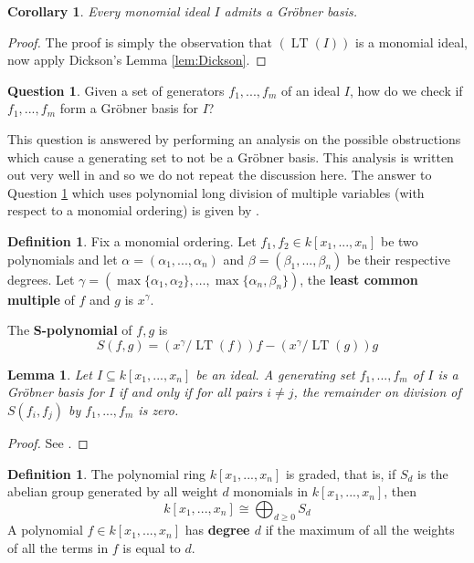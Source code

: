 \documentclass[12pt]{article}
\theoremstyle{plain}
\newtheorem{lemma}[thm]{Lemma}
\newtheorem{cor}[thm]{Corollary}
\theoremstyle{definition}
\newtheorem{defn}[thm]{Definition} %
\newtheorem{question}[thm]{Question}
\begin{document}
\begin{cor}\label{cor:grobner_basis_existence}
Every monomial ideal $I$ admits a Gr\"{o}bner basis.
\end{cor}
\begin{proof}
The proof is simply the observation that $(\operatorname{LT}(I))$ is a monomial ideal, now apply Dickson's Lemma \ref{lem:Dickson}.
\end{proof}
\begin{question}\label{question:Grobner_check}
Given a set of generators $f_1,...,f_m$ of an ideal $I$, how do we check if $f_1,...,f_m$ form a Gr\"{o}bner basis for $I$?
\end{question}
This question is answered by performing an analysis on the possible obstructions which cause a generating set to not be a Gr\"{o}bner basis. This analysis is written out very well in \cite[\S 2]{grobner} and so we do not repeat the discussion here. The answer to Question \ref{question:Grobner_check} which uses polynomial long division of multiple variables (with respect to a monomial ordering) is given by \cite[\S 2.3]{grobner}.
\begin{defn}
Fix a monomial ordering. Let $f_1,f_2 \in k[x_1,...,x_n]$ be two polynomials and let $\alpha = (\alpha_1,...,\alpha_n)$ and $\beta = (\beta_1,...,\beta_n)$ be their respective degrees. Let $\gamma = (\operatorname{max}\lbrace \alpha_1,\alpha_2\rbrace,\hdots,\operatorname{max}\lbrace \alpha_n,\beta_n\rbrace)$, the \textbf{least common multiple} of $f$ and $g$ is $x^\gamma$.

The \textbf{S-polynomial} of $f,g$ is
\begin{equation}
    S(f,g) = (x^\gamma/\operatorname{LT}(f))f - (x^\gamma/\operatorname{LT}(g))g
\end{equation}
\end{defn}
\begin{lemma}\label{lem:suffices_S_poly}
Let $I \subseteq k[x_1,...,x_n]$ be an ideal. A generating set $f_1,...,f_m$ of $I$ is a Gr\"{o}bner basis for $I$ if and only if for all pairs $i \neq j$, the remainder on division of $S(f_i,f_j)$ by $f_1,...,f_m$ is zero.
\end{lemma}
\begin{proof}
See \cite[\S 2.6 Theorem 6]{grobner}.
\end{proof}
\begin{defn}
	The polynomial ring $k[x_1,...,x_n]$ is graded, that is, if $S_d$ is the abelian group generated by all weight $d$ monomials in $k[x_1,...,x_n ]$, then
	\begin{equation}
		k[x_1,...,x_n] \cong \bigoplus_{d \geq 0}S_d
		\end{equation}
	A polynomial $f \in k[x_1,...,x_n]$ has \textbf{degree $d$} if the maximum of all the weights of all the terms in $f$ is equal to $d$.
	\end{defn}
\end{document}
